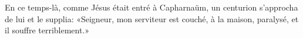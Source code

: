 En ce temps-là, comme Jésus était entré à Capharnaüm,
	un centurion s’approcha de lui et le supplia:
	«Seigneur, mon serviteur est couché, à la maison, paralysé,
	et il souffre terriblement.»
